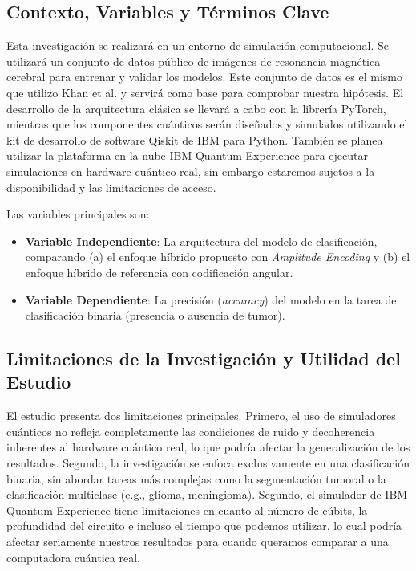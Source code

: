 \subsection*{Contexto, Variables y Términos Clave}

\justify
Esta investigación se realizará en un entorno de simulación computacional. Se utilizará un conjunto de datos público de imágenes de resonancia magnética cerebral \cite{cheng2017brain} para entrenar y validar los modelos. Este conjunto de datos es el mismo que utilizo Khan et al. \cite{khan2024brain} y servirá como base para comprobar nuestra hipótesis. El desarrollo de la arquitectura clásica se llevará a cabo con la librería PyTorch, mientras que los componentes cuánticos serán diseñados y simulados utilizando el kit de desarrollo de software Qiskit de IBM para Python. También se planea utilizar la plataforma en la nube IBM Quantum Experience para ejecutar simulaciones en hardware cuántico real, sin embargo estaremos sujetos a la disponibilidad y las limitaciones de acceso.

Las variables principales son:
\begin{itemize}
    \item \textbf{Variable Independiente}: La arquitectura del modelo de clasificación, comparando (a) el enfoque híbrido propuesto con \textit{Amplitude Encoding} y (b) el enfoque híbrido de referencia con codificación angular.
    \item \textbf{Variable Dependiente}: La precisión (\textit{accuracy}) del modelo en la tarea de clasificación binaria (presencia o ausencia de tumor).
\end{itemize}

\subsection*{Limitaciones de la Investigación y Utilidad del Estudio}

\justify
El estudio presenta dos limitaciones principales. Primero, el uso de simuladores cuánticos no refleja completamente las condiciones de ruido y decoherencia inherentes al hardware cuántico real, lo que podría afectar la generalización de los resultados. Segundo, la investigación se enfoca exclusivamente en una clasificación binaria, sin abordar tareas más complejas como la segmentación tumoral o la clasificación multiclase (e.g., glioma, meningioma). Segundo, el simulador de IBM Quantum Experience tiene limitaciones en cuanto al número de cúbits, la profundidad del circuito e incluso el tiempo que podemos utilizar, lo cual podría afectar seriamente nuestros resultados para cuando queramos comparar a una computadora cuántica real.

